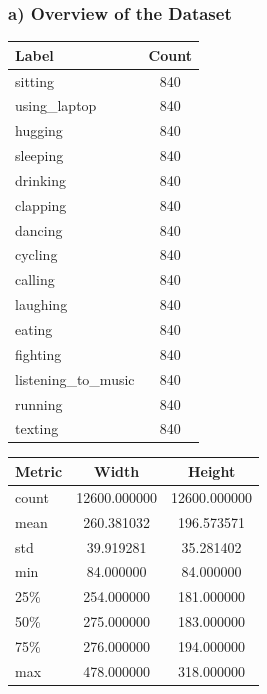 \documentclass{article}
\begin{document}
\subsubsection*{a) Overview of the Dataset}
\begin{table}[H]
\centering
\begin{minipage}{0.45\linewidth}
    \centering
    \begin{tabular}{|l|c|}
    \hline
    \textbf{Label} & \textbf{Count} \\ \hline
    sitting & 840 \\ \hline
    using\_laptop & 840 \\ \hline
    hugging & 840 \\ \hline
    sleeping & 840 \\ \hline
    drinking & 840 \\ \hline
    clapping & 840 \\ \hline
    dancing & 840 \\ \hline
    cycling & 840 \\ \hline
    calling & 840 \\ \hline
    laughing & 840 \\ \hline
    eating & 840 \\ \hline
    fighting & 840 \\ \hline
    listening\_to\_music & 840 \\ \hline
    running & 840 \\ \hline
    texting & 840 \\ \hline
    \end{tabular}
\end{minipage}
\hfill
\begin{minipage}{0.45\linewidth}
    \centering
    \begin{tabular}{|l|c|c|}
    \hline
    \textbf{Metric} & \textbf{Width} & \textbf{Height} \\ \hline
    count & 12600.000000 & 12600.000000 \\ \hline
    mean & 260.381032 & 196.573571 \\ \hline
    std & 39.919281 & 35.281402 \\ \hline
    min & 84.000000 & 84.000000 \\ \hline
    25\% & 254.000000 & 181.000000 \\ \hline
    50\% & 275.000000 & 183.000000 \\ \hline
    75\% & 276.000000 & 194.000000 \\ \hline
    max & 478.000000 & 318.000000 \\ \hline
    \end{tabular}
\end{minipage}
\end{table}
\end{document}
